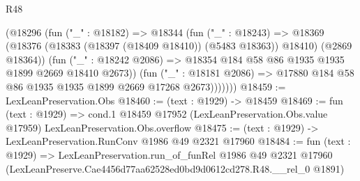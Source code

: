 \begin{lexlean}{R48}
\begin{coremodule}
              (@18296
                (fun ("_" : @18182) =>
                @18344
                  (fun ("_" : @18243) =>
                  @18369
                    (@18376 (@18383 (@18397 (@18409 @18410)) (@5483 @18363)) @18410)
                    (@2869 @18364))
                  (fun ("_" : @18242 @2086) =>
                  @18354 @184 @58 @86 @1935 @1935 @1899 @2669 @18410 @2673))
                (fun ("_" : @18181 @2086) =>
                @17880 @184 @58 @86 @1935 @1935 @1899 @2669 @17268 @2673)))))))
@18459 := LexLeanPreservation.Obs
@18460 := (text : @1929) -> @18459
@18469 := fun (text : @1929) =>
  cond.{1} @18459 @17952 (LexLeanPreservation.Obs.value @17959) LexLeanPreservation.Obs.overflow
@18475 := (text : @1929) -> LexLeanPreservation.RunConv @1986 @49 @2321 @17960
@18484 := fun (text : @1929) =>
  LexLeanPreservation.run_of_funRel
    @1986
    @49
    @2321
    @17960
    (LexLeanPreserve.Cae4456d77aa62528ed0bd9d0612cd278.R48.__rel_0 @1891)
\end{coremodule}
\end{lexlean}
